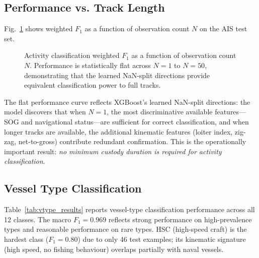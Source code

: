 \documentclass[journal]{IEEEtran}
\begin{document}
\subsection{Performance vs. Track Length}
\label{sec:results_partial}

Fig.~\ref{fig:f1_by_n} shows weighted $F_1$ as a function of observation
count $N$ on the AIS test set.

\begin{figure}[!t]
  \centering
  \caption{Activity classification weighted $F_1$ as a function of
           observation count $N$. Performance is statistically flat
           across $N=1$ to $N=50$, demonstrating that the learned
           NaN-split directions provide equivalent classification power
           to full tracks.}
  \label{fig:f1_by_n}
\end{figure}

The flat performance curve reflects XGBoost's learned NaN-split
directions: the model discovers that when $N=1$, the most discriminative
available features—SOG and navigational status—are sufficient for
correct classification, and when longer tracks are available, the
additional kinematic features (loiter index, zig-zag, net-to-gross)
contribute redundant confirmation.
%
This is the operationally important result: \emph{no minimum custody
duration is required for activity classification}.

\subsection{Vessel Type Classification}

Table~\ref{tab:vtype_results} reports vessel-type classification
performance across all 12 classes. The macro $F_1 = 0.969$ reflects strong
performance on high-prevalence types and reasonable performance on rare
types. HSC (high-speed craft) is the hardest class ($F_1 = 0.80$) due to
only 46 test examples; its kinematic signature (high speed, no fishing
behaviour) overlaps partially with naval vessels.
\end{document}
